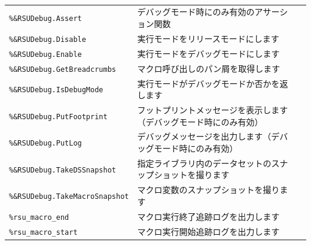 \paragraph{\DocStrTitleRDMPackageFunctionList}
\begin{center}
{\footnotesize
\begin{xltabular}{\textwidth}{|p{4truecm}|X|p{1.2truecm}|}
\hline
\thead{\DocStrHeaderFunctionName}&\thead{\DocStrDescription}&\thead{\DocStrRefto}\\
\hline
\hline
\texttt{\%\&RSUDebug.Assert}&デバッグモード時にのみ有効のアサーション関数&\\
\hline
\texttt{\%\&RSUDebug.Disable}&実行モードをリリースモードにします&\\
\hline
\texttt{\%\&RSUDebug.Enable}&実行モードをデバッグモードにします&\\
\hline
\texttt{\%\&RSUDebug.GetBreadcrumbs}&マクロ呼び出しのパン屑を取得します&\\
\hline
\texttt{\%\&RSUDebug.IsDebugMode}&実行モードがデバッグモードか否かを返します&\\
\hline
\texttt{\%\&RSUDebug.PutFootprint}&フットプリントメッセージを表示します（デバッグモード時にのみ有効）&\\
\hline
\texttt{\%\&RSUDebug.PutLog}&デバッグメッセージを出力します（デバッグモード時にのみ有効）&\\
\hline
\texttt{\%\&RSUDebug.TakeDSSnapshot}&指定ライブラリ内のデータセットのスナップショットを撮ります&\\
\hline
\texttt{\%\&RSUDebug.TakeMacroSnapshot}&マクロ変数のスナップショットを撮ります&\\
\hline
\texttt{\%rsu\_macro\_end}&マクロ実行終了追跡ログを出力します&\\
\hline
\texttt{\%rsu\_macro\_start}&マクロ実行開始追跡ログを出力します&\\
\hline
\end{xltabular}
}
\end{center}
